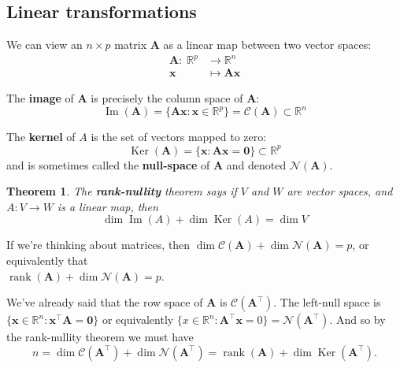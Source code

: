 \documentclass[
]{book}
\newtheorem{theorem}{Theorem}[chapter]
\theoremstyle{definition}
\theoremstyle{definition}
\theoremstyle{definition}
\theoremstyle{definition}
\theoremstyle{remark}
\begin{document}
\subsection{Linear transformations}\label{linear-transformations}

We can view an \(n\times p\) matrix \(\mathbf A\) as a linear map between two vector spaces:
\begin{align*}
\mathbf A: \;\mathbb{R}^p &\rightarrow   \mathbb{R}^n\\
 \mathbf x&\mapsto \mathbf A\mathbf x
\end{align*}

The \textbf{image} of \(\mathbf A\) is precisely the column space of \(\mathbf A\):
\[\operatorname{Im}(\mathbf A) = \{\mathbf A\mathbf x: \mathbf x\in \mathbb{R}^p\}=\mathcal{C}(\mathbf A) \subset \mathbb{R}^n\]

The \textbf{kernel} of \(A\) is the set of vectors mapped to zero:
\[\operatorname{Ker}(\mathbf A)=\{\mathbf x: \mathbf A\mathbf x={\boldsymbol 0}\}\subset \mathbb{R}^p\]
and is sometimes called the \textbf{null-space} of \(\mathbf A\) and denoted \(\mathcal{N}(\mathbf A)\).

\begin{theorem}
\protect\hypertarget{thm:ranknullity}{}\label{thm:ranknullity}The \textbf{rank-nullity} theorem says if \(V\) and \(W\) are vector spaces, and \(A: V\rightarrow W\) is a linear map, then
\[\dim \operatorname{Im}(A)+\dim \operatorname{Ker}(A) =\dim V\]
\end{theorem}

If we're thinking about matrices, then \(\dim \mathcal{C}(\mathbf A)+\dim \mathcal{N}(\mathbf A)=p\), or equivalently that\\
\(\operatorname{rank}(\mathbf A)+\dim \mathcal{N}(\mathbf A)=p\).

We've already said that the row space of \(\mathbf A\) is \(\mathcal{C}(\mathbf A^\top)\). The left-null space is \(\{\mathbf x\in \mathbb{R}^n: \mathbf x^\top \mathbf A={\boldsymbol 0}\}\) or equivalently \(\{x \in \mathbb{R}^n: \mathbf A^\top \mathbf x=0\}=\mathcal{N}(\mathbf A^\top)\). And so by the rank-nullity theorem we must have
\[n=\dim \mathcal{C}(\mathbf A^\top) + \dim \mathcal{N}(\mathbf A^\top)=
\operatorname{rank}(\mathbf A)+\dim \operatorname{Ker}(\mathbf A^\top).\]
\end{document}
